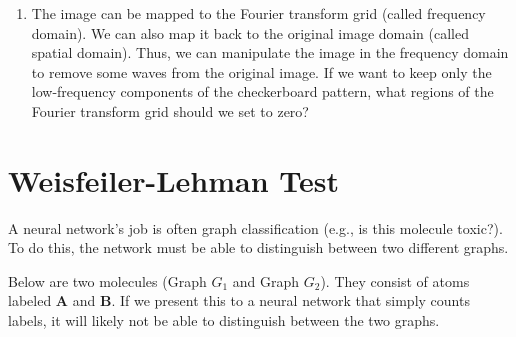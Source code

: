 \documentclass[a4paper, 12pt]{extarticle}
\begin{document}
\begin{enumerate}
\begin{center}
\end{center}

\item The image can be mapped to the Fourier transform grid (called frequency domain). We can also map it back to the original image domain (called spatial domain). Thus, we can manipulate the image in the frequency domain to remove some waves from the original image.
If we want to keep only the low-frequency components of the checkerboard pattern, what regions of the Fourier transform grid should we set to zero?

\end{enumerate}

\clearpage

\section*{Weisfeiler-Lehman Test}

A neural network's job is often graph classification (e.g., is this molecule toxic?). To do this, the network must be able to distinguish between two different graphs.

Below are two molecules (Graph $G_1$ and Graph $G_2$). They consist of atoms labeled \textbf{A} and \textbf{B}. If we present this to a neural network that simply counts labels, it will likely not be able to distinguish between the two graphs.
\end{document}
